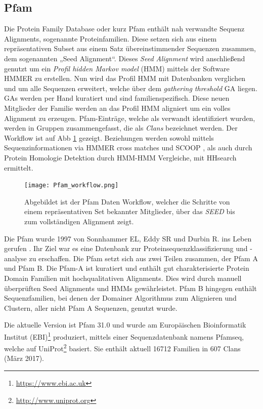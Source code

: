 \subsection{Pfam}
\label{sec:pfam}
Die Protein Family Database \cite{Finn.2014} oder kurz Pfam enthält nah verwandte Sequenz Alignments, sogenannte Proteinfamilien. Diese setzen sich aus einem repräsentativen Subset aus einem Satz übereinstimmender Sequenzen zusammen, dem sogenannten „Seed Alignment“. Dieses \emph{Seed Alignment} wird anschließend genutzt um ein \emph{Profil hidden Markov model} (HMM) \cite{Soding.2005} mittels der Software HMMER \cite{Mistry.2013} zu erstellen. Nun wird das Profil HMM mit Datenbanken verglichen und um alle Sequenzen erweitert, welche über dem \emph{gathering threshold} GA liegen. GAs werden per Hand kuratiert und sind familienspezifisch. Diese neuen Mitglieder der Familie werden an das Profil HMM aligniert um ein volles Alignment zu erzeugen. Pfam-Einträge, welche als verwandt identifiziert wurden, werden in Gruppen zusammengefasst, die als \emph{Clans} bezeichnet werden. Der Workflow ist auf \ac{Abb} \ref{fig:Pfam_workflow} gezeigt. Beziehungen werden sowohl mittels Sequenzinformationen via HMMER cross matches und SCOOP \cite{Bateman.2007}, als auch durch Protein Homologie Detektion durch HMM-HMM Vergleiche, mit HHsearch \cite{Fidler.2016} ermittelt.

\begin{figure}
\texttt{[image: Pfam\_workflow.png]}
\caption{Abgebildet ist der \ac{Pfam} Daten Workflow, welcher die Schritte von einem repräsentativen Set bekannter Mitglieder, über das \emph{SEED} bis zum vollständigen Alignment zeigt.}
\label{fig:Pfam_workflow}
\end{figure}

Die Pfam wurde 1997 von Sonnhammer EL, Eddy SR und Durbin R. ins Leben gerufen \cite{Sonnhammer.1997}. Ihr Ziel war es eine Datenbank zur Proteinsequenzklassifizierung und -analyse zu erschaffen. Die Pfam setzt sich aus zwei Teilen zusammen, der Pfam A und Pfam B. Die Pfam-A ist kuratiert und enthält gut charakterisierte Protein Domain Familien mit hochqualitativen Alignments. Dies wird durch manuell überprüften Seed Alignments und HMMs gewährleistet. Pfam B hingegen enthält Sequenzfamilien, bei denen der Domainer Algorithmus zum Alignieren und Clustern, aller nicht Pfam A Sequenzen, genutzt wurde. 

Die aktuelle Version ist Pfam 31.0 und wurde am Europäischen Bioinformatik Institut (EBI)\footnote{\url{https://www.ebi.ac.uk}} produziert, mittels einer Sequenzdatenbank namens Pfamseq, welche auf UniProt\footnote{\url{http://www.uniprot.org}} basiert. Sie enthält aktuell 16712 Familien in 607 Clans (März 2017).


